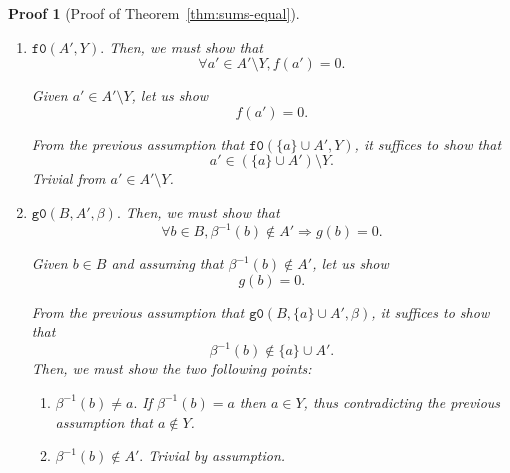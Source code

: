 \documentclass[pdflatex,sn-mathphys]{sn-jnl}%
\theoremstyle{thmstyleone}%
\theoremstyle{thmstyletwo}%
\newtheorem*{pf}{Proof}%
\theoremstyle{thmstylethree}%
\begin{document}
\begin{appendices}
\begin{pf}[Proof of Theorem~\ref{thm:sums-equal}]
\begin{enumerate}
\begin{enumerate}
\begin{enumerate}
           \item $\boxed{\mathtt{f0}(A',Y).}$ Then, we must show that
             \begin{equation*}
               \boxed{\forall{}a'\in{}A'\setminus{}Y,f(a')=0.}
             \end{equation*}

             Given $a'\in{}A'\setminus{}Y$, let us show
             \begin{equation*}
               \boxed{f(a')=0.}
             \end{equation*}

             From the previous assumption that
             $\mathtt{f0}(\{a\}\cup{}A',Y)$, it suffices to show that
             \begin{equation*}
               \boxed{a'\in(\{a\}\cup{}A')\setminus{}Y.}
             \end{equation*}
             Trivial from $a'\in{}A'\setminus{}Y$.
             
           \item $\boxed{\mathtt{g0}(B,A',\beta).}$ Then, we must show
             that
             \begin{equation*}
               \boxed{\forall{}b\in{}B,\beta^{-1}(b)\notin{}A'\Rightarrow{}g(b)=0.}
             \end{equation*}

             Given $b\in{}B$ and assuming that
             $\beta^{-1}(b)\notin{}A'$, let us show
             \begin{equation*}
               \boxed{g(b)=0.}
             \end{equation*}

             From the previous assumption that
             $\mathtt{g0}(B,\{a\}\cup{}A',\beta)$, it suffices to show that
             \begin{equation*}
               \boxed{\beta^{-1}(b)\notin{}\{a\}\cup{}A'.}
             \end{equation*}
             Then, we must show the two following points:
             \begin{enumerate}
             \item $\boxed{\beta^{-1}(b)\neq{}a.}$ If $\beta^{-1}(b)=a$
               then $a\in{}Y$, thus contradicting the previous
               assumption that $a\notin{}Y$.
             \item $\boxed{\beta^{-1}(b)\notin{}A'.}$ Trivial by
               assumption.
             \end{enumerate}
           \end{enumerate}
           
         \end{enumerate}
       \end{enumerate}
       
     \end{pf}

  
\end{appendices}



\end{document}
